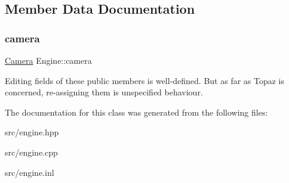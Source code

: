 \subsection{Member Data Documentation}
\mbox{\label{class_engine_a25924c4045f695c4fb6b6439777b1920}} 
\subsubsection{\texorpdfstring{camera}{camera}}
{\footnotesize\ttfamily \mbox{\hyperlink{class_camera}{Camera}} Engine\+::camera}

Editing fields of these public members is well-\/defined. But as far as Topaz is concerned, re-\/assigning them is unspecified behaviour. 

The documentation for this class was generated from the following files\+:\begin{DoxyCompactItemize}
\item 
src/engine.\+hpp\item 
src/engine.\+cpp\item 
src/engine.\+inl\end{DoxyCompactItemize}
